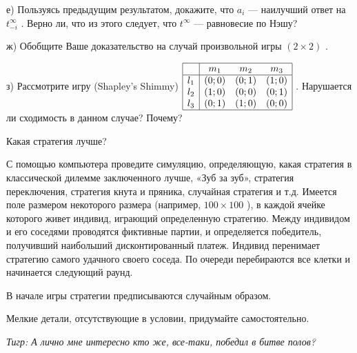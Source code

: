\begin{problem}
е) Пользуясь предыдущим результатом, докажите, что  $a_{i} $  — наилучший ответ на  $t_{-i}^{\infty } $ . Верно ли, что из этого следует, что  $t^{\infty } $  — равновесие по Нэшу?\par
ж) Обобщите Ваше доказательство на случай произвольной игры  $\left(2\times 2\right)$ .\par
з) Рассмотрите игру (Shapley's Shimmy)  $\begin{array}{|c|ccc|}  \hline {} & {m_{1} } & {m_{2} } & {m_{3} } \\  \hline {l_{1} } & {\left(0;0\right)} & {\left(0;1\right)} & {\left(1;0\right)} \\ {l_{2} } & {\left(1;0\right)} & {\left(0;0\right)} & {\left(0;1\right)} \\ {l_{3} } & {\left(0;1\right)} & {\left(1;0\right)} & {\left(0;0\right)} \\  \hline  \end{array}$ . Нарушается ли сходимость в данном случае? Почему?



\begin{sol}

\end{sol}
\end{problem}



\begin{problem}
 Какая стратегия лучше?\par
С помощью компьютера проведите симуляцию, определяющую, какая стратегия в классической дилемме заключенного лучше, «Зуб за зуб», стратегия переключения, стратегия кнута и пряника, случайная стратегия и т.д.
Имеется поле размером некоторого размера (например,  $100\times 100$ ), в каждой ячейке которого живет индивид, играющий определенную стратегию.
Между индивидом и его соседями проводятся фиктивные партии, и определяется победитель, получивший наибольший дисконтированный платеж. Индивид перенимает стратегию самого удачного своего соседа. По очереди перебираются все клетки и начинается следующий раунд.\par
В начале игры стратегии предписываются случайным образом.\par
Мелкие детали, отсутствующие в условии, придумайте самостоятельно.\par
{\it Тигр: А лично мне интересно кто же, все-таки, победил в битве полов?}



\begin{sol}

\end{sol}
\end{problem}



